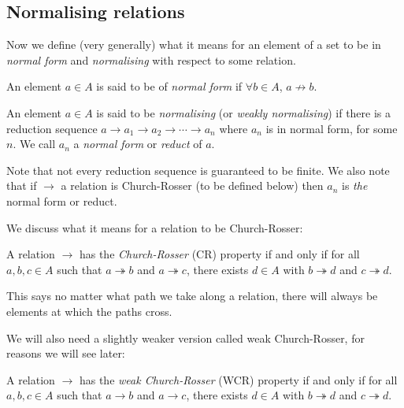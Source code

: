 \subsection{Normalising relations}

Now we define (very generally) what it means for an element of a set to be in \emph{normal form} and \emph{normalising} with respect to some relation.

\begin{defin}
    An element $a \in A$ is said to be of \emph{normal form} if $\forall b \in A$, $a {\not \to} b$.
\end{defin}

\begin{defin}
    An element $a \in A$ is said to be \emph{normalising} (or \emph{weakly normalising}) if there is a reduction sequence $a \to a_1 \to a_2 \to \cdots \to a_n$ where $a_n$ is in normal form, for some $n$. We call $a_n$ a \emph{normal form} or \emph{reduct} of $a$.
\end{defin}

% 
\begin{remark}
    Note that not every reduction sequence is guaranteed to be finite. We also note that if $\to$ a relation is Church-Rosser (to be defined below) then $a_n$ is \emph{the} normal form or reduct.
\end{remark}

We discuss what it means for a relation to be Church-Rosser:

\begin{defin}
    A relation $\to$ has the \emph{Church-Rosser} (CR) property if and only if for all $a,b,c \in A$ such that $a \twoheadrightarrow b$ and $a \twoheadrightarrow c$, there exists $d \in A$ with $b \twoheadrightarrow d$ and $c \twoheadrightarrow d$.
\end{defin}

\begin{remark}
    This says no matter what path we take along a relation, there will always be elements at which the paths cross.
\end{remark}

We will also need a slightly weaker version called weak Church-Rosser, for reasons we will see later:

\begin{defin}
    A relation $\to$ has the \emph{weak Church-Rosser} (WCR) property if and only if for all $a, b, c \in A$ such that $a \to b$ and $a \to c$, there exists $d \in A$ with $b \twoheadrightarrow d$ and $c \twoheadrightarrow d$.
\end{defin}

